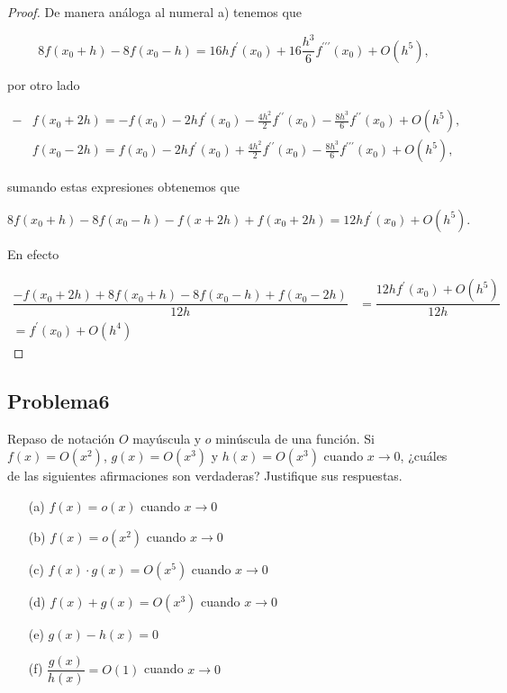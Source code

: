 \documentclass[12pt, a4paper]{article}%
\begin{document}
\begin{proof}
    De manera análoga al numeral a) tenemos que
    
$$
8f\left(x_0+h\right)-8f\left(x_0-h\right)=16 h f^{\prime}\left(x_0\right)+16\frac{h^3}{6} f^{\prime \prime \prime}\left(x_0\right)+O(h^5),
$$

por otro lado

$$\begin{aligned}
 -&f(x_0+2 h)=-f\left(x_0\right)-2h f^{\prime}\left(x_0\right)-\frac{4 h^2}{2} f^{\prime \prime}\left(x_0\right)-\frac{8 h^3}{6} f^{\prime \prime}\left(x_0\right)+O\left(h^5\right),\\
& f(x_0-2 h)=f\left(x_0\right)-2 h f^{\prime}\left(x_0\right)+\frac{4 h^2}{2}f^{\prime\prime}(x_0)-\frac{8 h^3}{6} f^{\prime \prime \prime}\left(x_0\right)+O\left(h^5\right),
\end{aligned}
$$

sumando estas expresiones obtenemos que 

$$8f\left(x_0+h\right)-8f\left(x_0-h\right)-f(x+2h)+f(x_0+2h)=12hf^{\prime}(x_0)+O(h^5).$$

En efecto 

\begin{align*}
     \dfrac{-f(x_0 + 2h) + 8f(x_0 + h) - 8f(x_0 - h) + f(x_0 - 2h)}{12h}&=\dfrac{12hf^{\prime}(x_0)+O(h^5)}{12h}\\
     =f^{\prime}(x_0)+O(h^4)
\end{align*}

\end{proof}
\subsection*{Problema6}
Repaso de notación \( O \) mayúscula y \( o \) minúscula de una función. Si \( f(x) = O(x^2) \), \( g(x) = O(x^3) \) y \( h(x) = O(x^3) \) cuando \( x \to 0 \), ¿cuáles de las siguientes afirmaciones son verdaderas? Justifique sus respuestas.

\begin{itemize}
    \item[(a)] \( f(x) = o(x) \) cuando \( x \to 0 \)
    \item[(b)] \( f(x) = o(x^2) \) cuando \( x \to 0 \)
    \item[(c)] \( f(x) \cdot g(x) = O(x^5) \) cuando \( x \to 0 \)
    \item[(d)] \( f(x) + g(x) = O(x^3) \) cuando \( x \to 0 \)
    \item[(e)] \( g(x) - h(x) = 0 \)
    \item[(f)] \( \dfrac{g(x)}{h(x)} = O(1) \) cuando \( x \to 0 \)
\end{itemize}
\end{document}

